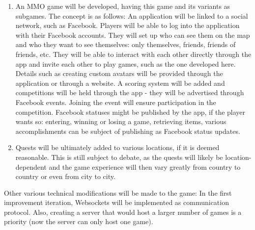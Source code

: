 \begin{enumerate}
  \item An MMO game will be developed, having this game and its variants as
  subgames. The concept is as follows: An application will be linked to a social
  network, such as Facebook. Players will be able to log into the application
  with their Facebook accounts. They will set up who can see them on the map and
  who they want to see themselves: only themselves, friends, friends of friends,
  etc. They will be able to interact with each other directly through the app
  and invite each other to play games, such as the one developed here. Details
  such as creating custom avatars will be provided through the application or
  through a website. A scoring system will be added and competitions will be
  held through the app - they will be advertised through Facebook events.
  Joining the event will ensure participation in the competition. Facebook
  statuses might be published by the app, if the player wants so: entering,
  winning or losing a game, retrieving items, various accomplishments can be
  subject of publishing as Facebook status updates.
  
  \item Quests will be ultimately added to various locations, if it is deemed
  reasonable. This is still subject to debate, as the quests will likely be
  location-dependent and the game experience will then vary greatly from
  country to country or even from city to city.
  
\end{enumerate}

Other various technical modifications will be made to the game: In the first
improvement iteration, Websockets will be implemented as communication protocol.
Also, creating a server that would host a larger number of games is a priority
(now the server can only host one game).




